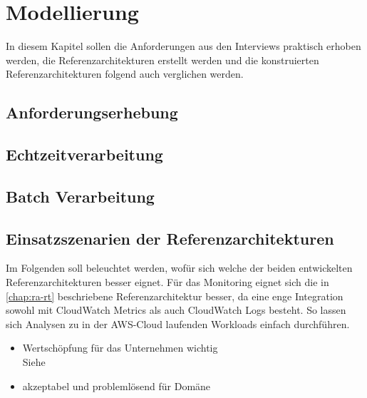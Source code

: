 \chapter{Modellierung}
In diesem Kapitel sollen die Anforderungen aus den Interviews praktisch erhoben werden, die Referenzarchitekturen erstellt werden und die konstruierten Referenzarchitekturen folgend auch verglichen werden.
\section{Anforderungserhebung}


\section{Echtzeitverarbeitung}\label{chap:ra-rt}


\section{Batch Verarbeitung}


\section{Einsatzszenarien der Referenzarchitekturen}
Im Folgenden soll beleuchtet werden, wofür sich welche der beiden entwickelten Referenzarchitekturen besser eignet.
Für das Monitoring eignet sich die in \autoref{chap:ra-rt} beschriebene Referenzarchitektur besser, da eine enge Integration sowohl mit CloudWatch Metrics als auch CloudWatch Logs besteht. So lassen sich Analysen zu in der \ac{AWS}-Cloud laufenden Workloads einfach durchführen.


\begin{itemize}
\item Wertschöpfung für das Unternehmen wichtig\\
Siehe 
\item akzeptabel und problemlösend für Domäne\\
\end{itemize}

